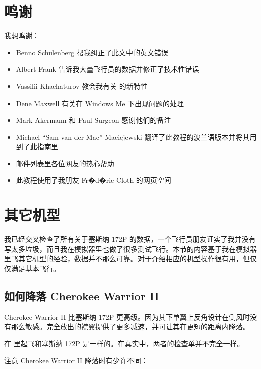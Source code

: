 \begin{itemize}
\section{鸣谢}

我想鸣谢：
\begin{itemize}
\item Benno Schulenberg 帮我纠正了此文中的英文错误
\item Albert Frank 告诉我大量飞行员的数据并修正了技术性错误
\item Vassilii Khachaturov 教会我有关 \FlightGear{} 的新特性
\item Dene Maxwell 有关在 Windows Me 下出现问题的处理
\item Mark Akermann 和 Paul Surgeon 感谢他们的备注
\item Michael ``Sam van der Mac'' Maciejewski 翻译了此教程的波兰语版本并将其用到了此指南里
\item \FlightGear{} 邮件列表里各位网友的热心帮助
\item {} 此教程使用了我朋友 Fr�d�ric Cloth 的网页空间
\end{itemize}

\section{其它机型}

我已经交叉检查了所有关于塞斯纳 172P 的数据，一个飞行员朋友证实了我并没有写太多垃圾，而且我在模拟器里也做了很多测试飞行。本节的内容基于我在模拟器里飞其它机型的经验，数据并不那么可靠。对于介绍相应的机型操作很有用，但仅仅满足基本飞行。

\subsection{如何降落 Cherokee Warrior II}
\label{sec:Cherokee}

Cherokee Warrior II 比塞斯纳 172P 更高级。因为其下单翼上反角设计在侧风时没有那么敏感。完全放出的襟翼提供了更多减速，并可让其在更短的距离内降落。

在 \FlightGear{} 里起飞和塞斯纳 172P 是一样的。在真实中，两者的检查单并不完全一样。

注意 Cherokee Warrior II 降落时有少许不同：


\end{itemize}
